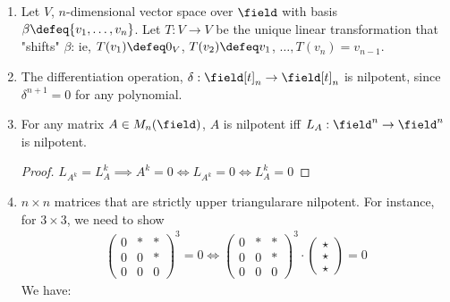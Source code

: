 
\begin{example}
    \begin{enumerate}
        \item Let $V$, $n$-dimensional vector space over $\field$ with basis $\beta \defeq \{v_1, \dots, v_n\}$. Let $T: V \to V$ be the unique linear transformation that "shifts" $\beta$: ie, $T(v_1) \defeq 0_V$, $T(v_2) \defeq v_1$, $\dots, T(v_n)  = v_{n-1}$.
        \item The differentiation operation, $\delta : \field[t]_n \to \field[t]_n$ is nilpotent, since $\delta^{n+1} = 0$ for any polynomial.
        \item For any matrix $A \in M_{n}(\field)$, $A$ is nilpotent iff $L_A : \field^n \to \field^n$ is nilpotent.
        \begin{proof}
            $L_{A^k} = L_A^k \implies A^k = 0 \iff L_{A^k}= 0 \iff L_{A}^k = 0$
        \end{proof}
        \item $n \times n$ matrices that are strictly upper triangular\footnotemark are nilpotent. For instance, for $3 \times 3$, we need to show\footnotemark
        \begin{align*}
            \begin{pmatrix}
                0 & \ast &\ast\\
                0 & 0 & \ast\\
                0 & 0 & 0
            \end{pmatrix}^3 = 0 \iff \begin{pmatrix}
                0 & \ast &\ast\\
                0 & 0 & \ast\\
                0 & 0 & 0
            \end{pmatrix}^3\cdot \begin{pmatrix}
                \star\\
                \star\\
                \star
            \end{pmatrix} = 0
        \end{align*}
        We have:
        \begin{align*}

\end{align*}
\end{enumerate}
\end{example}
